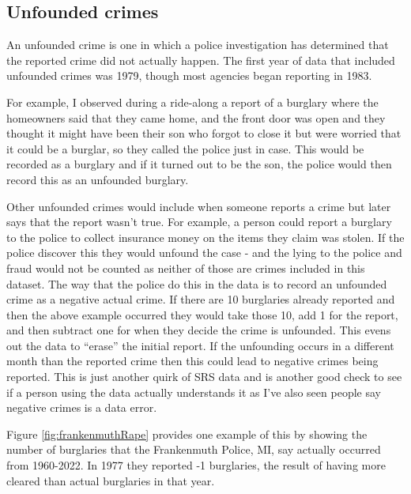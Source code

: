 \documentclass[
  12pt,
  openany]{book}
\begin{document}
\subsection{Unfounded crimes}\label{unfounded}

An unfounded crime is one in which a police investigation has determined that the reported crime did not actually happen. The first year of data that included unfounded crimes was 1979, though most agencies began reporting in 1983.

For example, I observed during a ride-along a report of a burglary where the homeowners said that they came home, and the front door was open and they thought it might have been their son who forgot to close it but were worried that it could be a burglar, so they called the police just in case. This would be recorded as a burglary and if it turned out to be the son, the police would then record this as an unfounded burglary.

Other unfounded crimes would include when someone reports a crime but later says that the report wasn't true. For example, a person could report a burglary to the police to collect insurance money on the items they claim was stolen. If the police discover this they would unfound the case - and the lying to the police and fraud would not be counted as neither of those are crimes included in this dataset. The way that the police do this in the data is to record an unfounded crime as a negative actual crime. If there are 10 burglaries already reported and then the above example occurred they would take those 10, add 1 for the report, and then subtract one for when they decide the crime is unfounded. This evens out the data to ``erase'' the initial report. If the unfounding occurs in a different month than the reported crime then this could lead to negative crimes being reported. This is just another quirk of SRS data and is another good check to see if a person using the data actually understands it as I've also seen people say negative crimes is a data error.

Figure \ref{fig:frankenmuthRape} provides one example of this by showing the number of burglaries that the Frankenmuth Police, MI, say actually occurred from 1960-2022. In 1977 they reported -1 burglaries, the result of having more cleared than actual burglaries in that year.
\end{document}
